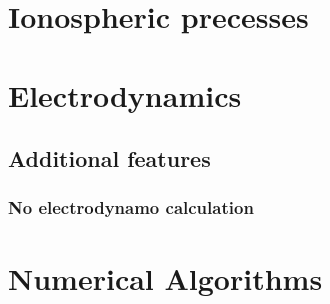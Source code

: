 \documentclass[12pt]{book}
\begin{document}
\chapter{Ionospheric precesses}




\chapter{Electrodynamics}










\section{Additional features}

\subsection{No electrodynamo calculation}

\chapter{Numerical Algorithms}

%


%
\end{document}
